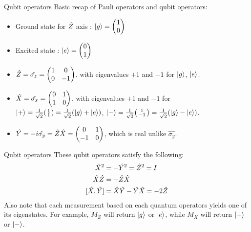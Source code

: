 \documentclass{beamer}
\begin{document}
    \begin{frame}{Qubit operators}
        Basic recap of Pauli operators and qubit operators:
        \begin{itemize}
            \item Ground state for $\shat{Z}$ axis : $\ket{g} = \begin{pmatrix} 1 \\ 0 \end{pmatrix}$
            \item Excited state : $\ket{e} = \begin{pmatrix} 0 \\ 1 \end{pmatrix}$
            \item $\shat{Z} = \hat{\sigma_z} = \begin{pmatrix}
            1 & 0 \\
            0 & -1
            \end{pmatrix}$, with eigenvalues $+1$ and $-1$ for $\ket{g}$, $ \ket{e} $.
            \item $\shat{X} = \hat{\sigma_x} = \begin{pmatrix}
            0 & 1 \\
            1 & 0
            \end{pmatrix}$, with eigenvalues $+1$ and $-1$ for $\ket{+} = \frac{1}{\sqrt{2}}\begin{psmallmatrix} 1 \\ 1 \end{psmallmatrix} = \frac{1}{\sqrt{2}}(\ket{g} + \ket{e})$, $\ket{-} = \frac{1}{\sqrt{2}}\begin{psmallmatrix} 1 \\ -1 \end{psmallmatrix} = \frac{1}{\sqrt{2}}(\ket{g} - \ket{e})$.
            \item $\shat{Y} = -i\hat{\sigma_y} = \shat{Z}\shat{X} = \begin{pmatrix}
            0 & 1 \\
            -1 & 0
            \end{pmatrix}$, which is real unlike $ \hat{\sigma_y} $.
        \end{itemize}
    \end{frame}
    
    \begin{frame}{Qubit operators}
        These qubit operators satisfy the following:
        \begin{equation}
        \begin{split}
            \shat{X}^2 &= -\shat{Y}^2 = \shat{Z}^2 = I \\
            \shat{X}\shat{Z} &= -\shat{Z}\shat{X} \\
            [\shat{X},\shat{Y}] &= \shat{X}\shat{Y} - \shat{Y}\shat{X} = -2\shat{Z}
        \end{split}
        \end{equation}
        Also note that each measurement based on each quantum operators yields one of its eigenstates. For example, $M_Z$ will return $ \ket{g} $ or $ \ket{e} $, while $ M_X $ will return $ \ket{+} $ or $ \ket{-} $.
    \end{frame} 
\end{document}
